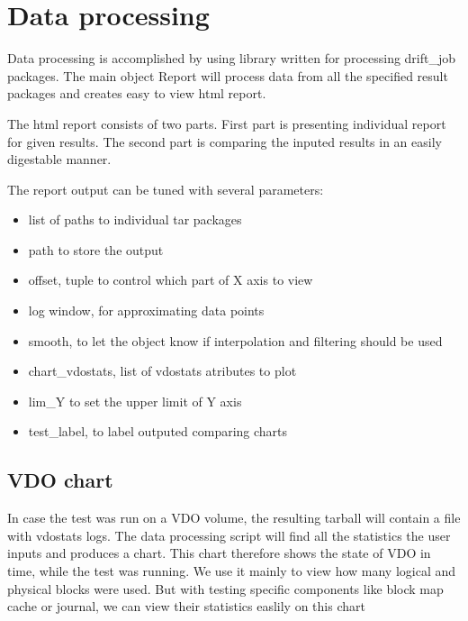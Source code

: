 \documentclass[
  color, %
  table, %
  lof,   %
  lot,   %
]{fithesis3}
\begin{document}

\section{Data processing}
Data processing is accomplished by using library written for processing drift\_job packages. The main object Report will process data from all the specified result packages and creates easy to view html report.

The html report consists of two parts. First part is presenting individual report for given results. The second part is comparing the inputed results in an easily digestable manner.

The report output can be tuned with several parameters:

\begin{itemize}
    \item list of paths to individual tar packages
    \item path to store the output
    \item offset, tuple to control which part of X axis to view
    \item log window, for approximating data points
    \item smooth, to let the object know if interpolation and filtering should be used
    \item chart\_vdostats, list of vdostats atributes to plot
    \item lim\_Y to set the upper limit of Y axis
    \item test\_label, to label outputed comparing charts
\end{itemize}





\subsection{VDO chart}
In case the test was run on a VDO volume, the resulting tarball will contain a file with vdostats logs. The data processing script will find all the statistics the user inputs and produces a chart. This chart therefore shows the state of VDO in time, while the test was running. We use it mainly to view how many logical and physical blocks were used. But with testing specific components like block map cache or journal, we can view their statistics easlily on this chart
\end{document}
